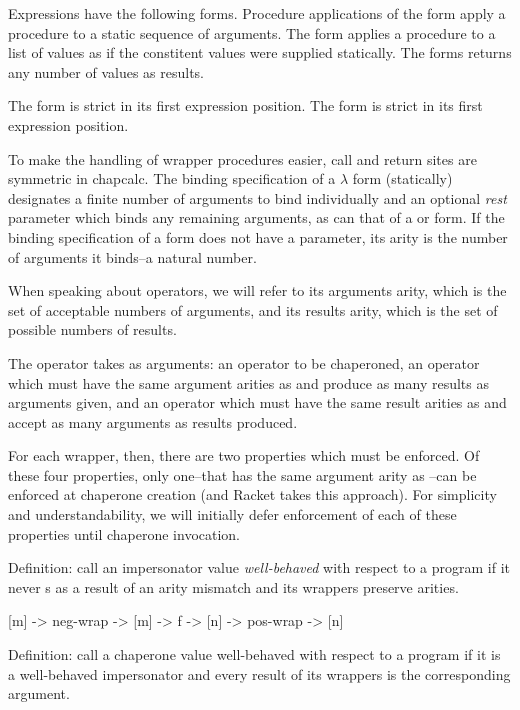 \documentclass{sigplanconf}
\begin{document}
Expressions  have the following forms.
Procedure applications of the form  apply a procedure to a static sequence of arguments.
The  form applies a procedure to a list of values as if the constitent values were supplied statically.
The  forms returns any number of values as results. 

The  form is strict in its first expression position.
The  form is strict in its first expression position.

To make the handling of wrapper procedures easier, call and return sites are symmetric in chapcalc. The binding specification of a $\lambda$ form (statically) designates a finite number of arguments to bind individually and an optional \emph{rest} parameter which binds any remaining arguments, as can that of a  or  form. If the binding specification of a form does not have a  parameter, its arity is the number of arguments it binds--a natural number.

When speaking about operators, we will refer to its arguments arity, which is the set of acceptable numbers of arguments, and its results arity, which is the set of possible numbers of results.

The  operator takes as arguments: an operator  to be chaperoned, an operator  which must have the same argument arities as  and produce as many results as arguments given, and an operator  which must have the same result arities as  and accept as many arguments as results produced.

For each wrapper, then, there are two properties which must be enforced.
Of these four properties, only one--that  has the same argument arity as --can be enforced at chaperone creation (and Racket takes this approach). For simplicity and understandability, we will initially defer enforcement of each of these properties until chaperone invocation.

Definition: call an impersonator value \emph{well-behaved} with respect to a program if it never s as a result of an arity mismatch and its wrappers preserve arities.

[m] -> neg-wrap -> [m] -> f -> [n] -> pos-wrap -> [n]

Definition: call a chaperone value well-behaved with respect to a program if it is a well-behaved impersonator and every result of its wrappers is  the corresponding argument.
\end{document}
